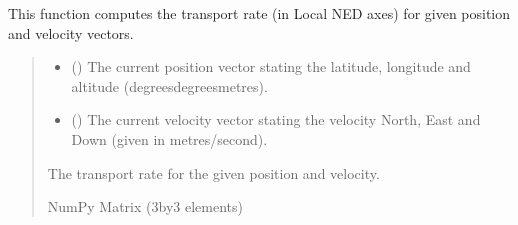 \documentclass[letterpaper,10pt,english]{sphinxmanual}
\begin{document}
\begin{fulllineitems}
\label{\detokenize{modules/util/transformations:qnav.util.transformations.get_transport_rate}}
\pysigstartsignatures
{}
\pysigstopsignatures
\sphinxAtStartPar
This function computes the transport rate (in Local NED axes) for given
position and velocity vectors.
\begin{quote}\begin{description}
\begin{itemize}
\item {} 
\sphinxAtStartPar
{} (\sphinxstyleliteralemphasis{\sphinxupquote{ (}}\sphinxstyleliteralemphasis{\sphinxupquote{)}}) \textendash{} The current position vector stating the latitude,
longitude and altitude (degrees\sphinxhyphen{}degrees\sphinxhyphen{}metres).

\item {} 
\sphinxAtStartPar
{} (\sphinxstyleliteralemphasis{\sphinxupquote{ (}}\sphinxstyleliteralemphasis{\sphinxupquote{)}}) \textendash{} The current velocity vector stating the velocity
North, East and Down (given in metres/second).

\end{itemize}

\sphinxAtStartPar
The transport rate for the given position and velocity.

\sphinxAtStartPar
NumPy Matrix (3\sphinxhyphen{}by\sphinxhyphen{}3 elements)

\end{description}\end{quote}

\end{fulllineitems}

\end{document}
